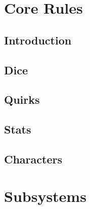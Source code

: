 



    \let\cleardoublepage\clearpage

    \setlength{\headsep}{1cm}
    \setlength{\headheight}{30.0pt}
    \addtolength{\topmargin}{-0.75cm}

    \maketitle

    \afterpage{\blankpage}

    \tableofcontents

    \part{Core Rules}

    \chapter{Introduction}
    

    \chapter{Dice}
    

    \renewcommand{\hsubtitle}{Do I Want to be Me?}
    \chapter{Quirks}
    

    \chapter{Stats}
    

    \chapter{Characters}
    

    \part{Subsystems}

